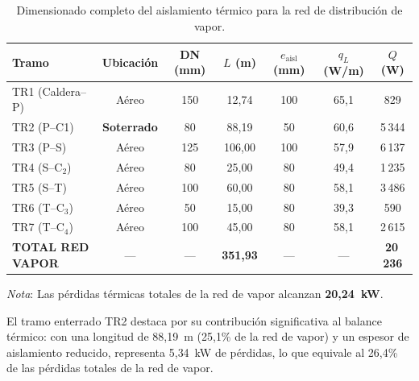 \documentclass[12pt]{article}
\begin{document}
\begin{table}[htbp]
	\centering
	\caption{Dimensionado completo del aislamiento térmico para la red de distribución de vapor.}
	\label{tab:resumen_vapor_completo}
	\begin{tabular}{lcccccc}
		\toprule
		\textbf{Tramo}           & \textbf{Ubicación} & \textbf{DN (mm)} & \textbf{$L$ (m)}  & \textbf{$e_{\text{aisl}}$ (mm)} & \textbf{$q_L$ (W/m)} & \textbf{$Q$ (W)} \\
		\midrule
		TR1 (Caldera--P)         & Aéreo              & 150              & 12{,}74           & 100                             & 65{,}1               & 829              \\
		TR2 (P--C1)           & \textbf{Soterrado} & 80               & 88{,}19           & 50                              & 60{,}6               & 5\,344           \\
		TR3 (P--S)               & Aéreo              & 125              & 106{,}00          & 100                             & 57{,}9               & 6\,137           \\
		TR4 (S--C$_2$)           & Aéreo              & 80               & 25{,}00           & 80                              & 49{,}4               & 1\,235           \\
		TR5 (S--T)               & Aéreo              & 100              & 60{,}00           & 80                              & 58{,}1               & 3\,486           \\
		TR6 (T--C$_3$)           & Aéreo              & 50               & 15{,}00           & 80                              & 39{,}3               & 590              \\
		TR7 (T--C$_4$)           & Aéreo              & 100              & 45{,}00           & 80                              & 58{,}1               & 2\,615           \\
		\midrule
		\textbf{TOTAL RED VAPOR} & ---                & ---              & \textbf{351{,}93} & ---                             & ---                  & \textbf{20\,236} \\
		\bottomrule
	\end{tabular}
	\vspace{0.3cm}

	\noindent \small \textit{Nota}: Las pérdidas térmicas totales de la red de vapor alcanzan \textbf{20{,}24~kW}.
\end{table}

El tramo enterrado TR2 destaca por su contribución significativa al balance térmico: con una longitud de 88{,}19~m (25{,}1\% de la red de vapor) y un espesor de aislamiento reducido, representa 5{,}34~kW de pérdidas, lo que equivale al 26{,}4\% de las pérdidas totales de la red de vapor.
\end{document}
